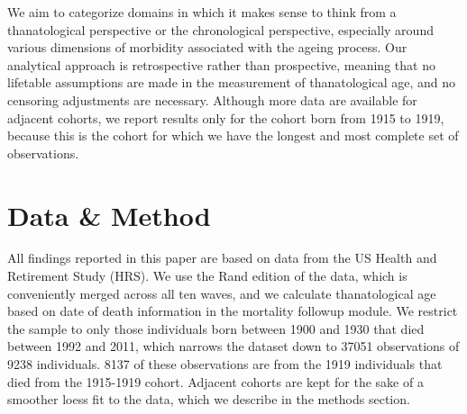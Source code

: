 \documentclass{article}
\begin{document}


We aim to categorize domains in which it makes
sense to think from a thanatological perspective or the chronological
perspective, especially around various dimensions of morbidity associated with
the ageing process. Our analytical approach is retrospective rather than
prospective, meaning that no lifetable assumptions are made in the measurement
of thanatological age, and no censoring adjustments are necessary. Although more
data are available for adjacent cohorts, we report results only for the cohort born from 1915 to 1919, because this is the cohort for which we have the longest and
most complete set of observations. 

\section*{Data \& Method}

All findings reported in this paper are based on data from the US Health and
Retirement Study (HRS). We use the Rand edition of the data, which is
conveniently merged across all ten waves, and we calculate thanatological age
based on date of death information in the mortality followup module. We
restrict the sample to only those individuals born between 1900 and 1930 that
died between 1992 and 2011, which narrows the dataset down to 37051 observations
of 9238 individuals. 8137 of these observations are from the 1919 individuals
that died from the 1915-1919 cohort. Adjacent cohorts are kept for the sake of a
smoother loess fit to the data, which we describe in the methods section.
\end{document}
